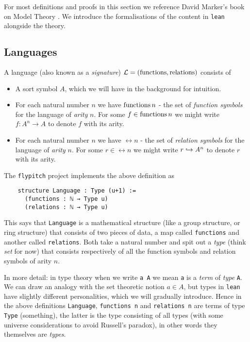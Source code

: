 For most definitions and proofs in this section we reference
David Marker's book on Model Theory \cite{marker}.
We introduce the formalisations of the content in \texttt{lean} alongside the theory.

\subsection{Languages}
\begin{dfn}[Language]
  A language (also known as a \textit{signature}) $\mathcal{L} = ( \operatorname{functions} , \operatorname{relations} )$ consists of

  \begin{itemize}
    \item A sort symbol $A$, which we will have in the background for intuition.
    \item For each natural number $n$ we have $\operatorname{functions} n$ -
          the set of \textit{function symbols} for the language of \textit{arity} $n$.
          For some $f \in \operatorname{functions} n$ we might write
          $f : A^{n} \to A$ to denote $f$ with its arity.
    \item For each natural number $n$ we have $\rel n$ -
          the set of \textit{relation symbols} for the language of \textit{arity} $n$.
          For some $r \in \rel n$ we might write
          $r \hookrightarrow A^{n}$ to denote $r$ with its arity.
  \end{itemize}

  The \texttt{flypitch} project implements the above definition as

  \begin{lstlisting}
    structure Language : Type (u+1) :=
      (functions : ℕ → Type u)
      (relations : ℕ → Type u)\end{lstlisting}

  This says that \texttt{Language} is a mathematical structure
  (like a group structure, or ring structure)
  that consists of two pieces of data,
  a map called \texttt{functions} and another called \texttt{relations}.
  Both take a natural number and spit out a \textit{type} (think \textit{set} for now)
  that consists respectively of all the function symbols and relation symbols of arity $n$.

  In more detail: in type theory when we write \texttt{a A} we mean \texttt{a} is a \textit{term}
  of \textit{type} \texttt{A}.
  We can draw an analogy with the set theoretic notion $a \in A$,
  but types in \texttt{lean} have slightly different
  personalities, which we will gradually introduce.
  Hence in the above definitions \texttt{Language}, \texttt{functions n} and \texttt{relations n}
  are terms of type \texttt{Type} (something),
  the latter is the type consisting of all types (with some universe considerations to avoid Russell's paradox),
  in other words they themselves are \textit{types}.


\end{dfn}
